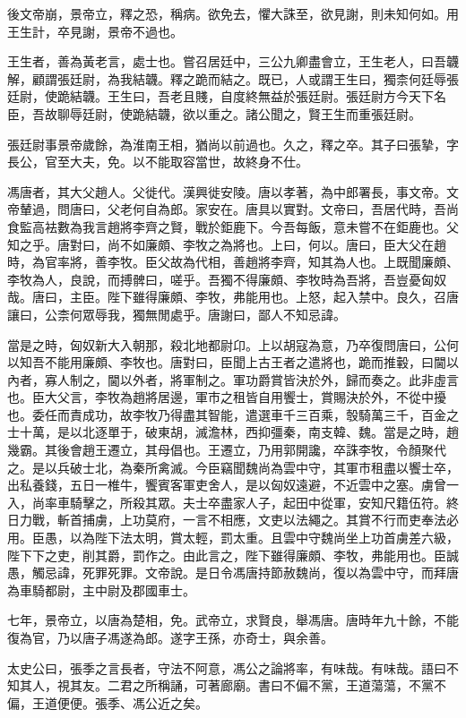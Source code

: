 後文帝崩，景帝立，釋之恐，稱病。欲免去，懼大誅至，欲見謝，則未知何如。用王生計，卒見謝，景帝不過也。

王生者，善為黃老言，處士也。嘗召居廷中，三公九卿盡會立，王生老人，曰吾韤解，顧謂張廷尉，為我結韤。釋之跪而結之。既已，人或謂王生曰，獨柰何廷辱張廷尉，使跪結韤。王生曰，吾老且賤，自度終無益於張廷尉。張廷尉方今天下名臣，吾故聊辱廷尉，使跪結韤，欲以重之。諸公聞之，賢王生而重張廷尉。

張廷尉事景帝歲餘，為淮南王相，猶尚以前過也。久之，釋之卒。其子曰張摯，字長公，官至大夫，免。以不能取容當世，故終身不仕。

馮唐者，其大父趙人。父徙代。漢興徙安陵。唐以孝著，為中郎署長，事文帝。文帝輦過，問唐曰，父老何自為郎。家安在。唐具以實對。文帝曰，吾居代時，吾尚食監高袪數為我言趙將李齊之賢，戰於鉅鹿下。今吾每飯，意未嘗不在鉅鹿也。父知之乎。唐對曰，尚不如廉頗、李牧之為將也。上曰，何以。唐曰，臣大父在趙時，為官率將，善李牧。臣父故為代相，善趙將李齊，知其為人也。上既聞廉頗、李牧為人，良說，而搏髀曰，嗟乎。吾獨不得廉頗、李牧時為吾將，吾豈憂匈奴哉。唐曰，主臣。陛下雖得廉頗、李牧，弗能用也。上怒，起入禁中。良久，召唐讓曰，公柰何眾辱我，獨無閒處乎。唐謝曰，鄙人不知忌諱。

當是之時，匈奴新大入朝那，殺北地都尉卬。上以胡寇為意，乃卒復問唐曰，公何以知吾不能用廉頗、李牧也。唐對曰，臣聞上古王者之遣將也，跪而推轂，曰閫以內者，寡人制之，閫以外者，將軍制之。軍功爵賞皆決於外，歸而奏之。此非虛言也。臣大父言，李牧為趙將居邊，軍市之租皆自用饗士，賞賜決於外，不從中擾也。委任而責成功，故李牧乃得盡其智能，遣選車千三百乘，彀騎萬三千，百金之士十萬，是以北逐單于，破東胡，滅澹林，西抑彊秦，南支韓、魏。當是之時，趙幾霸。其後會趙王遷立，其母倡也。王遷立，乃用郭開讒，卒誅李牧，令顏聚代之。是以兵破士北，為秦所禽滅。今臣竊聞魏尚為雲中守，其軍市租盡以饗士卒，出私養錢，五日一椎牛，饗賓客軍吏舍人，是以匈奴遠避，不近雲中之塞。虜曾一入，尚率車騎擊之，所殺其眾。夫士卒盡家人子，起田中從軍，安知尺籍伍符。終日力戰，斬首捕虜，上功莫府，一言不相應，文吏以法繩之。其賞不行而吏奉法必用。臣愚，以為陛下法太明，賞太輕，罰太重。且雲中守魏尚坐上功首虜差六級，陛下下之吏，削其爵，罰作之。由此言之，陛下雖得廉頗、李牧，弗能用也。臣誠愚，觸忌諱，死罪死罪。文帝說。是日令馮唐持節赦魏尚，復以為雲中守，而拜唐為車騎都尉，主中尉及郡國車士。

七年，景帝立，以唐為楚相，免。武帝立，求賢良，舉馮唐。唐時年九十餘，不能復為官，乃以唐子馮遂為郎。遂字王孫，亦奇士，與余善。

太史公曰，張季之言長者，守法不阿意，馮公之論將率，有味哉。有味哉。語曰不知其人，視其友。二君之所稱誦，可著廊廟。書曰不偏不黨，王道蕩蕩，不黨不偏，王道便便。張季、馮公近之矣。